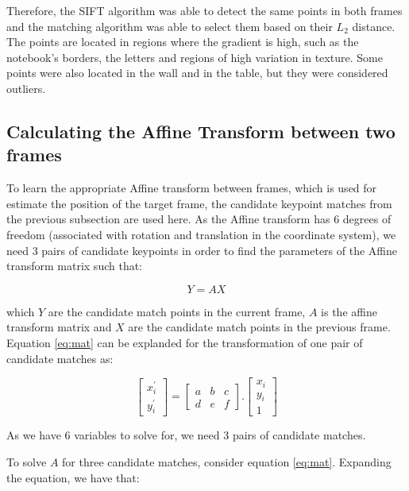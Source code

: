 \documentclass[]{IEEEtran}
\begin{document}
Therefore, the SIFT algorithm was able to detect the same points in both frames and the matching algorithm was able to select them based on their $L_2$ distance. The points are located in regions where the gradient is high, such as the notebook's borders, the letters and regions of high variation in texture. Some points were also located in the wall and in the table, but they were considered outliers.


\subsection{Calculating the Affine Transform between two frames}

To learn the appropriate Affine transform between frames, which is used for estimate the position of the target frame, the candidate keypoint matches from the previous subsection are used here. As the Affine transform has 6 degrees of freedom (associated with rotation and translation in the coordinate system), we need 3 pairs of candidate keypoints in order to find the parameters of the Affine transform matrix such that:

\begin{equation}
    Y = AX
    \label{eq:mat}
\end{equation}

which $Y$ are the candidate match points in the current frame, $A$ is the affine transform matrix and $X$ are the candidate match points in the previous frame. 
Equation \ref{eq:mat} can be explanded for the transformation of one pair of candidate matches as:

\begin{equation}
\begin{bmatrix}
  x_{i}^{'} \\ y_{i}^{'}
\end{bmatrix}  =
\begin{bmatrix}
  a & b & c \\ d & e & f
\end{bmatrix}.
\begin{bmatrix}
  x_{i} \\ y_{i} \\ 1
\end{bmatrix}  
\end{equation}

As we have 6 variables to solve for, we need 3 pairs of candidate matches.

To solve $A$ for three candidate matches, consider equation \ref{eq:mat}. Expanding the equation, we have that:
\end{document}
